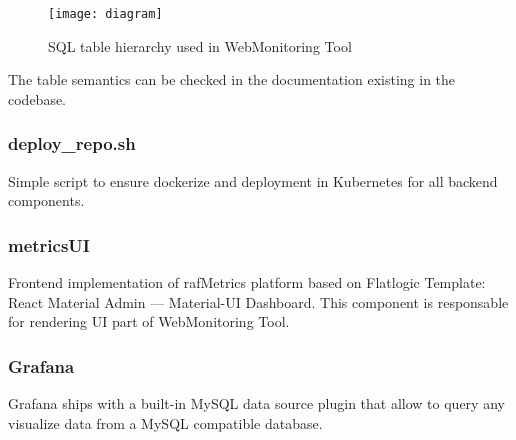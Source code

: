 \begin{figure}[H]
    \centering
    \texttt{[image: diagram]}
    \caption{SQL table hierarchy used in WebMonitoring Tool}
\end{figure}

The table semantics can be checked in the documentation existing in the codebase.

\subsubsection{deploy\_repo.sh}
Simple script to ensure dockerize and deployment in Kubernetes for all backend components.

\subsubsection{metricsUI}
Frontend implementation of rafMetrics platform based on Flatlogic Template: React Material Admin — Material-UI Dashboard. This component is responsable for rendering UI part of WebMonitoring Tool.

\subsubsection{Grafana}
Grafana ships with a built-in MySQL data source plugin that allow to query any visualize data from a MySQL compatible database.